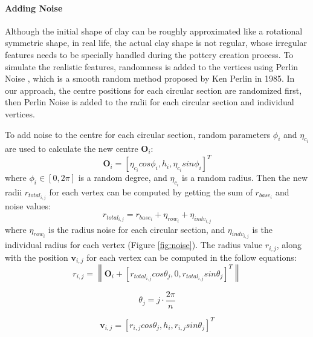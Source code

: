 \documentclass{svjour3}                     %
\begin{document}
\paragraph{Adding Noise} Although the initial shape of clay can be roughly approximated like a rotational symmetric shape, in real life, the actual clay shape is not regular, whose irregular features needs to be specially handled during the pottery creation process. To simulate the realistic features, randomness is added to the vertices using Perlin Noise \cite{Perlin1985An}, which is a smooth random method proposed by Ken Perlin in 1985.
In our approach, the centre positions for each circular section are randomized first, then Perlin Noise is added to the radii for each circular section and individual vertices.

To add noise to the centre for each circular section, random parameters $\phi_{i}$ and $\eta_{c_{i}}$ are used to calculate the new centre $\mathbf{O}_{i}$:
\begin{equation}
\label{eqn:oi}
\mathbf{O}_{i} = \left[\eta_{c_{i}}cos\phi_{i}, h_{i}, \eta_{c_{i}}sin\phi_{i}\right]^T
\end{equation}
where $\phi_{i} \in [0, 2\pi]$ is a random degree, and $\eta_{c_{i}}$ is a random radius.
Then the new radii $r_{total_{i,j}}$ for each vertex can be computed by getting the sum of $r_{base_{i}}$ and noise values:
\begin{equation}
r_{total_{i,j}} = r_{base_{i}} + \eta_{row_{i}} + \eta_{indv_{i,j}}
\end{equation}
where $\eta_{row_{i}}$ is the radius noise for each circular section, and $\eta_{indv_{i,j}}$ is the individual radius for each vertex (Figure \ref{fig:noise}). The radius value $r_{i,j}$, along with the position $\mathbf{v}_{i,j}$ for each vertex can be computed in the follow equations:
\begin{equation}
r_{i,j} = \left\|
\mathbf{O}_{i} + \left[ r_{total_{i,j}} cos \theta_{j},
0,
r_{total_{i,j}} sin \theta_{j}
\right]^T
\right\| 
\end{equation}

\begin{equation}
\theta_{j} = j \cdot \frac{2\pi}{n}
\end{equation}

\begin{equation}
\label{eqn:v}
\mathbf{v}_{i,j} =
\left[r_{i,j}  cos \theta_{j},
h_{i},
r_{i,j} sin \theta_{j}\right]^T
\end{equation}
\end{document}
